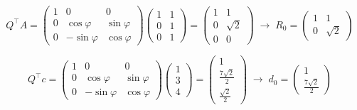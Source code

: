 \begin{solution}
    \begin{equation*}
        Q^\top A = \begin{pmatrix}
            1 & 0 & 0\\
            0 & \cos \varphi & \sin \varphi\\
            0 & -\sin \varphi & \cos \varphi
        \end{pmatrix} \begin{pmatrix}
            1 & 1\\
            0 & 1\\
            0 & 1
        \end{pmatrix} = \begin{pmatrix}
            1 & 1\\
            0 & \sqrt{2}\\
            0 & 0
        \end{pmatrix} \; \rightarrow \; R_0 = \begin{pmatrix}
            1 & 1\\
            0 & \sqrt{2}
        \end{pmatrix}
    \end{equation*}

    \vspace{1\baselineskip}

    \begin{equation*}
        Q^\top c = \begin{pmatrix}
            1 & 0 & 0\\
            0 & \cos \varphi & \sin \varphi\\
            0 & -\sin \varphi & \cos \varphi
        \end{pmatrix} \begin{pmatrix}
            1\\
            3\\
            4
        \end{pmatrix} = \begin{pmatrix}
            1\\
            \frac{7 \sqrt{2}}{2}\\
            \frac{\sqrt{2}}{2}
        \end{pmatrix}  \; \rightarrow \; d_0 = \begin{pmatrix}
            1\\
            \frac{7 \sqrt{2}}{2}
        \end{pmatrix}
    \end{equation*}


\end{solution}
